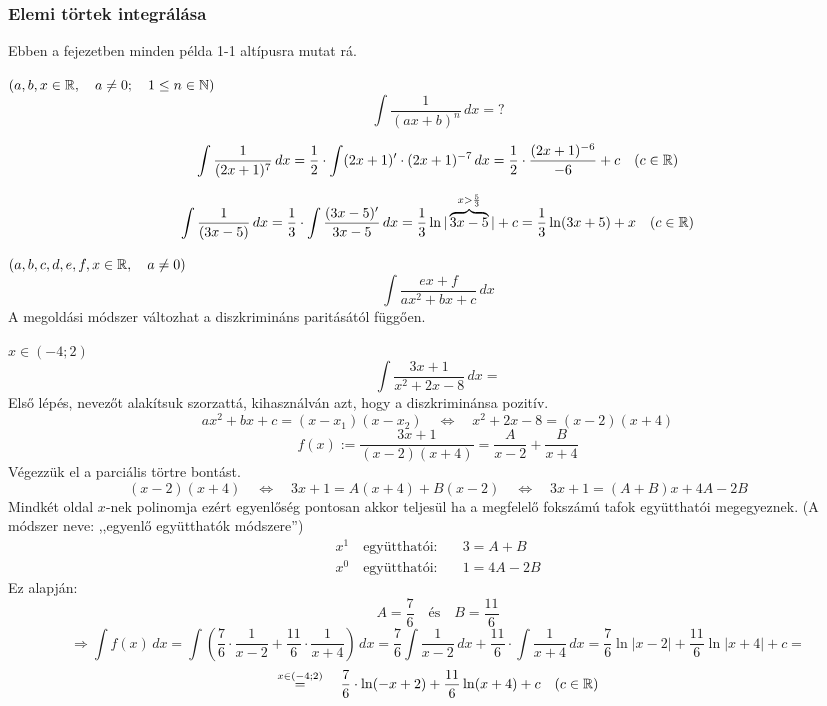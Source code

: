 \documentclass[a4paper,11.5pt]{article}
\begin{document}
	\subsubsection{Elemi törtek integrálása}
	Ebben a fejezetben minden példa 1-1 altípusra mutat rá.
	\begin{example}
		$(a,b,x\in\mathbb{R},\quad a\not=0;\quad 1\leq n\in\mathbb{N})$
		\[ \int\frac{1}{(ax+b)^n}\,dx=? \]
	\end{example}
	\begin{task}
		\[ \int\frac{1}{(2x+1)^7}\,dx=\frac{1}{2}\cdot\int(2x+1)'\cdot(2x+1)^{-7}\,dx=\frac{1}{2}\cdot\frac{(2x+1)^{-6}}{-6}+c\quad (c\in\mathbb{R}) \]
	\end{task}
	\begin{task}
		\[ \int\frac{1}{(3x-5)}\,dx=\frac{1}{3}\cdot\int\frac{(3x-5)'}{3x-5}\,dx=\frac{1}{3}\ln|\overbrace{3x-5}^{x>\frac{5}{3}}|+c=\frac{1}{3}\ln(3x+5)+x\quad (c\in\mathbb{R}) \]
	\end{task}
	\begin{example}$(a,b,c,d,e,f,x\in\mathbb{R},\quad a\not=0)$
		\[ \int\frac{ex+f}{ax^2+bx+c}\,dx \]
		A megoldási módszer változhat a diszkrimináns paritásától függően.
	\end{example}
	\begin{task}$x\in(-4;2)$
		\[ \int\frac{3x+1}{x^2+2x-8}\,dx= \]
		Első lépés, nevezőt alakítsuk szorzattá, kihasználván azt, hogy a diszkriminánsa pozitív.
		\[ ax^2+bx+c=(x-x_1)(x-x_2)\quad \Leftrightarrow\quad x^2+2x-8=(x-2)(x+4) \]
		\[ f(x):=\frac{3x+1}{(x-2)(x+4)}=\frac{A}{x-2}+\frac{B}{x+4} \]
		Végezzük el a parciális törtre bontást.
		\[ (x-2)(x+4)\quad \Leftrightarrow\quad 3x+1=A(x+4)+B(x-2)\quad \Leftrightarrow\quad 3x+1=(A+B)x+4A-2B \]
		Mindkét oldal $x$-nek polinomja ezért egyenlőség pontosan akkor teljesül ha a megfelelő fokszámú tafok együtthatói megegyeznek. (A módszer neve: ,,egyenlő együtthatók módszere'')
		\begin{align*}
			x^1\quad  \text{együtthatói:}& \quad 3=A+B\\
			x^0\quad  \text{együtthatói:}& \quad 1=4A-2B
		\end{align*}
		Ez alapján:
		\[ A=\frac{7}{6}\quad \text{és}\quad B=\frac{11}{6} \]
		\[ \Rightarrow\int f(x)\,dx=\int\left(\frac{7}{6}\cdot\frac{1}{x-2}+\frac{11}{6}\cdot\frac{1}{x+4}\right)\,dx=\frac{7}{6}\int\frac{1}{x-2}\,dx+\frac{11}{6}\cdot\int\frac{1}{x+4}\,dx=\frac{7}{6}\ln|x-2|+\frac{11}{6}\ln|x+4|+c=\]
		\[\overset{x\in(-4;2)}{=}\quad \frac{7}{6}\cdot\ln(-x+2)+\frac{11}{6}\ln(x+4)+c\quad (c\in\mathbb{R}) \]
	\end{task}
\end{document}
